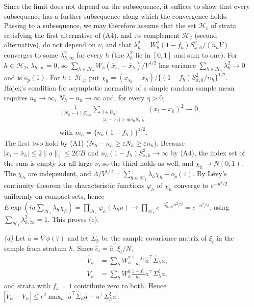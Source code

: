 Since the limit does not depend on the subsequence, it suffices to show that every subsequence has
a further subsequence along which the convergence holds. Passing to a subsequence, we may therefore
assume that the set $\mathcal H_1$ of strata satisfying the first alternative of (A4), and its
complement $\mathcal H_2$ (second alternative), do not depend on $\nu$, and that
$\lambda_h^2=W_h^2(1-f_h)S^2_{x,h}/(n_hV)$ converges to some $\lambda_{h,\infty}^2$ for every $h$
(the $\lambda_h^2$ lie in $[0,1]$ and sum to one). For $h\in\mathcal H_2$,
$\lambda_{h,\infty}=0$, so $\sum_{h\in\mathcal H_2}W_h(\bar x_{s_h}-\bar x_h)/V^{1/2}$ has variance
$\sum_{h\in\mathcal H_2}\lambda_h^2\to0$ and is $o_p(1)$. For $h\in\mathcal H_1$, put
$\chi_h=(\bar x_{s_h}-\bar x_h)/\{(1-f_h)S^2_{x,h}/n_h\}^{1/2}$. Hájek's condition for asymptotic
normality of a simple random sample mean \citep{hajek1960} requires $n_h\to\infty$,
$N_h-n_h\to\infty$ and, for every $\eta>0$,
\begin{align*}
&\frac{1}{(N_h-1)S^2_{x,h}}\sum_{\substack{i\in U_h:\\ |x_i-\bar x_h|>\eta m_hS_{x,h}}}(x_i-\bar x_h)^2\to0,\\
&\text{with } m_h=\{n_h(1-f_h)\}^{1/2}.
\end{align*}
The first two hold by (A1) ($N_h-n_h\ge\varepsilon N_h\ge\varepsilon n_h$). Because
$|x_i-\bar x_h|\le2\|a\|_1\le2CB$ and $n_h(1-f_h)S^2_{x,h}\to\infty$ by (A4), the index set of the
sum is empty for all large $\nu$, so the third holds as well, and $\chi_h\to N(0,1)$. The $\chi_h$
are independent, and $\Lambda/V^{1/2}=\sum_{h\in\mathcal H_1}\lambda_h\chi_h+o_p(1)$. By Lévy's
continuity theorem the characteristic functions $\varphi_h$ of $\chi_h$ converge to
$e^{-u^2/2}$ uniformly on compact sets, hence
$E\exp(iu\sum_{\mathcal H_1}\lambda_h\chi_h)=\prod_{\mathcal H_1}\varphi_h(\lambda_hu)\to
\prod_{\mathcal H_1}e^{-\lambda_{h,\infty}^2u^2/2}=e^{-u^2/2}$, using
$\sum_{\mathcal H_1}\lambda_{h,\infty}^2=1$. This proves (c).

\emph{(d)} Let $\hat a=\nabla\phi(\hat\tau)$ and let $\hat\Sigma_h$ be the sample covariance matrix
of $\xi_i$ in the sample from stratum $h$. Since $\hat e_i=\hat a^\top\xi_i/N$,
\begin{align*}
\hat V_\psi&=\sum_hW_h^2\frac{1-f_h}{n_h}\hat a^\top\hat\Sigma_h\hat a,\\
V_\psi&=\sum_hW_h^2\frac{1-f_h}{n_h}a^\top\Sigma^\xi_ha,
\end{align*}
and strata with $f_h=1$ contribute zero to both. Hence
$|\hat V_\psi-V_\psi|\le r^2\max_h|\hat a^\top\hat\Sigma_h\hat a-a^\top\Sigma^\xi_ha|$.

